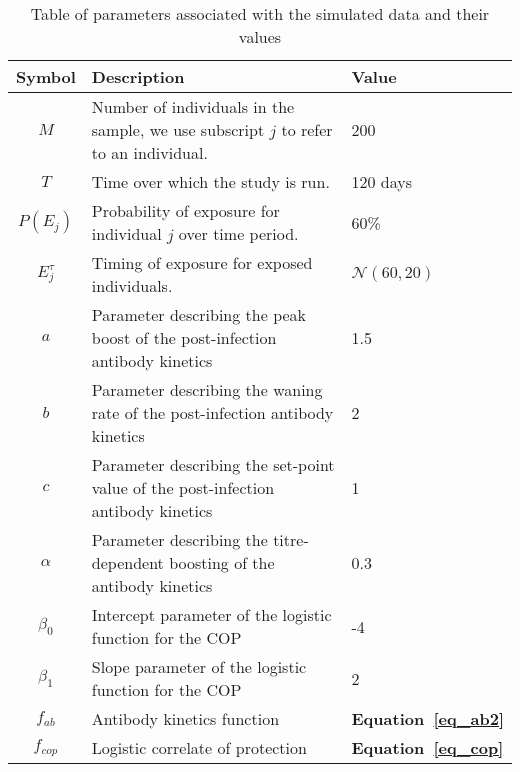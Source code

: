 \begin{table}[H]
    \centering
    \begin{tabular}{|c|l| l| }
         \hline
        \textbf{Symbol} & \textbf{Description} & \textbf{Value}\\
        \hline
         $M$ & Number of individuals in the sample, we use subscript $j$ to refer to an individual.& 200 \\ \hline
         $T$ & Time over which the study is run.  & 120 days \\ \hline         
         $P(E_j)$ & Probability of exposure for individual $j$ over time period.  & 60\% \\ \hline
         $E^\tau_j$ & Timing of exposure for exposed individuals.  & $\mathcal{N}(60, 20)$ \\ \hline
         $a$ & Parameter describing the peak boost of the post-infection antibody kinetics   & 1.5 \\ \hline
         $b$ &  Parameter describing the waning rate of the post-infection antibody kinetics &  2\\ \hline
         $c$ & Parameter describing the set-point value of the post-infection antibody kinetics & 1 \\ \hline
         $\alpha$ &  Parameter describing the titre-dependent boosting of the antibody kinetics & 0.3 \\ \hline
         $\beta_0$ & Intercept parameter of the logistic function for the COP  & -4 \\ \hline
         $\beta_1$&  Slope parameter of the logistic function for the COP  &  2 \\ \hline
         $f_{ab}$ & Antibody kinetics function & \textbf{Equation~\ref{eq_ab2}} \\ \hline         
         $f_{cop}$ & Logistic correlate of protection  & \textbf{Equation~\ref{eq_cop}} \\ \hline
    \end{tabular}
    \caption{Table of parameters associated with the simulated data and their values}
   	\label{table:not_sim}
\end{table}